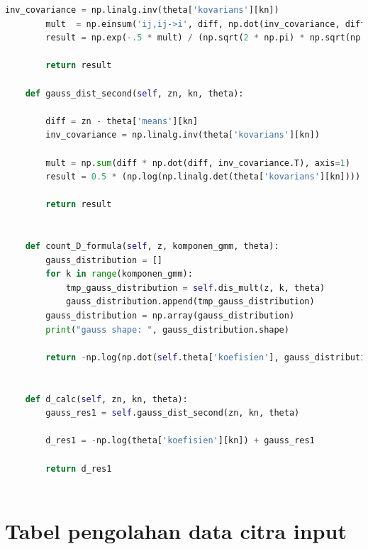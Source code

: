 \begin{lstlisting}[language=Python, basicstyle=\tiny]
		inv_covariance = np.linalg.inv(theta['kovarians'][kn])
		mult  = np.einsum('ij,ij->i', diff, np.dot(inv_covariance, diff.T).T)
		result = np.exp(-.5 * mult) / (np.sqrt(2 * np.pi) * np.sqrt(np.linalg.det(theta['kovarians'][kn])))

		return result

	def gauss_dist_second(self, zn, kn, theta):

		diff = zn - theta['means'][kn]
		inv_covariance = np.linalg.inv(theta['kovarians'][kn])

		mult = np.sum(diff * np.dot(diff, inv_covariance.T), axis=1)
		result = 0.5 * (np.log(np.linalg.det(theta['kovarians'][kn]))) + 0.5 * mult

		return result


	def count_D_formula(self, z, komponen_gmm, theta):
		gauss_distribution = []
		for k in range(komponen_gmm):
			tmp_gauss_distribution = self.dis_mult(z, k, theta)
			gauss_distribution.append(tmp_gauss_distribution)
		gauss_distribution = np.array(gauss_distribution)
		print("gauss shape: ", gauss_distribution.shape)

		return -np.log(np.dot(self.theta['koefisien'], gauss_distribution))

	
	def d_calc(self, zn, kn, theta):
		gauss_res1 = self.gauss_dist_second(zn, kn, theta)

		d_res1 = -np.log(theta['koefisien'][kn]) + gauss_res1

		return d_res1
	
\end{lstlisting}

\chapter{Tabel pengolahan data citra input}

